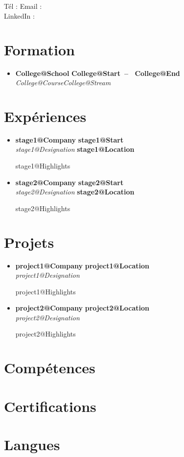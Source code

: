 \documentclass[letterpaper,11pt]{article}
\makeatletter
\newcommand{\resumeSubheading}[4]{
  \vspace{-2pt}\item
    \textbf{#1} \hfill \textbf{\small #2} \\
    \textit{\small#3} \hfill \textbf{\small #4}
    \vspace{-5pt}
}
\newcommand{\resumeSubHeadingListStart}{\begin{itemize}[leftmargin=0.15in, label={}]}
\newcommand{\resumeSubHeadingListEnd}{\end{itemize}}
\def\titlesection{
\begin{center}
    {\Huge \firstname \ \lastname} \\ \vspace{2pt}
    \normalsize \textit{\role} \\ \vspace{4pt}
    \small T\'el : \jasphone \quad Email : \email \\
    LinkedIn : \linkedin
    \vspace{-8pt}
\end{center}
}
\newcommand{\renderExp}[1]{
  \resumeSubheading
      {\csname #1@Company\endcsname}{\csname #1@Location\endcsname}
      {\csname #1@Designation\endcsname}{}
  \csname #1@Highlights\endcsname
}
\newcommand{\renderStage}[1]{
  \resumeSubheading
      {\csname #1@Company\endcsname}{\csname #1@Start\endcsname}
      {\csname #1@Designation\endcsname}{\csname #1@Location\endcsname}
  \csname #1@Highlights\endcsname
}
\makeatother
\begin{document}
\titlesection

\vspace{1em}

\section{Formation}
  \resumeSubHeadingListStart
      \resumeSubheading{\csname College@School\endcsname}
      {\csname College@Start\endcsname \ -- \ \csname College@End\endcsname}
      {\csname College@Course\endcsname \csname College@Stream\endcsname}{}
  \resumeSubHeadingListEnd

\section{Exp\'eriences}
  \resumeSubHeadingListStart
    \renderStage{stage1}
    \renderStage{stage2}
  \resumeSubHeadingListEnd

\section{Projets}
  \resumeSubHeadingListStart
    \renderExp{project1}
    \renderExp{project2}
  \resumeSubHeadingListEnd

\section{Comp\'etences}
\skills

\section{Certifications}
\certifications

\section{Langues}
\langs
\end{document}

